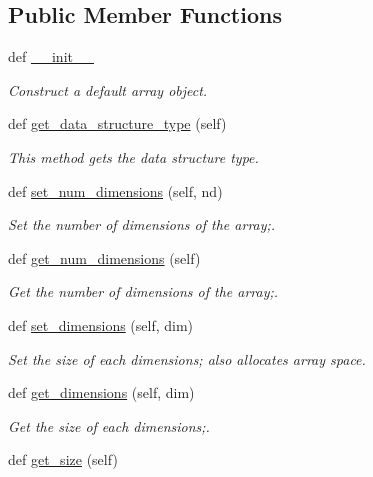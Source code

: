 \subsection*{Public Member Functions}
\begin{DoxyCompactItemize}
\item 
def \hyperlink{class_array_1_1_array_a35f27607f31ccfdede99590a30dc461c}{\+\_\+\+\_\+init\+\_\+\+\_\+}
\begin{DoxyCompactList}\small\item\em Construct a default array object. \end{DoxyCompactList}\item 
def \hyperlink{class_array_1_1_array_ab3a1e6afee220e0f6d2630836a0b7a0f}{get\+\_\+data\+\_\+structure\+\_\+type} (self)
\begin{DoxyCompactList}\small\item\em This method gets the data structure type. \end{DoxyCompactList}\item 
def \hyperlink{class_array_1_1_array_a5100331b1f7cb0448f235fd40d05f614}{set\+\_\+num\+\_\+dimensions} (self, nd)
\begin{DoxyCompactList}\small\item\em Set the number of dimensions of the array;. \end{DoxyCompactList}\item 
def \hyperlink{class_array_1_1_array_a237805bcdde6280bec65ebe0f68ce4e9}{get\+\_\+num\+\_\+dimensions} (self)
\begin{DoxyCompactList}\small\item\em Get the number of dimensions of the array;. \end{DoxyCompactList}\item 
def \hyperlink{class_array_1_1_array_afd27d06e12ffe980aa7e49d8a769dcf4}{set\+\_\+dimensions} (self, dim)
\begin{DoxyCompactList}\small\item\em Set the size of each dimensions; also allocates array space. \end{DoxyCompactList}\item 
def \hyperlink{class_array_1_1_array_a2cc5a41231b0dd595dc376d9463803bc}{get\+\_\+dimensions} (self, dim)
\begin{DoxyCompactList}\small\item\em Get the size of each dimensions;. \end{DoxyCompactList}\item 
def \hyperlink{class_array_1_1_array_a838c2a69bd0ddd3f15558aef3018dd36}{get\+\_\+size} (self)

\end{DoxyCompactItemize}
